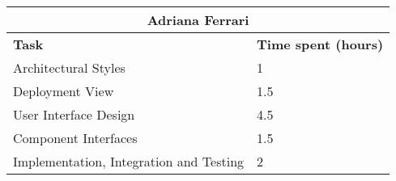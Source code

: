 \begin{table}[h]
  \center
  \begin{tabular}{l|l}
    \multicolumn{2}{c}{\textbf{Adriana Ferrari}} \\
    \hline
    \textbf{Task} & \textbf{Time spent (hours)}\\
    \hline
    Architectural Styles & 1 \\
    Deployment View & 1.5 \\
    User Interface Design & 4.5 \\
    Component Interfaces & 1.5 \\ 
    Implementation, Integration and Testing & 2 \\
  \end{tabular}
\end{table}